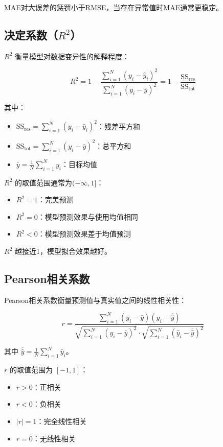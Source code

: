 \documentclass[UTF8, a4paper, 12pt]{article}
\begin{document}
MAE对大误差的惩罚小于RMSE，当存在异常值时MAE通常更稳定。

\subsection{决定系数（$R^2$）}

$R^2$ 衡量模型对数据变异性的解释程度：

\begin{equation}
R^2 = 1 - \frac{\sum_{i=1}^{N} (y_i - \hat{y}_i)^2}{\sum_{i=1}^{N} (y_i - \bar{y})^2} = 1 - \frac{\text{SS}_{\text{res}}}{\text{SS}_{\text{tot}}}
\end{equation}

其中：
\begin{itemize}
    \item $\text{SS}_{\text{res}} = \sum_{i=1}^{N} (y_i - \hat{y}_i)^2$：残差平方和
    \item $\text{SS}_{\text{tot}} = \sum_{i=1}^{N} (y_i - \bar{y})^2$：总平方和
    \item $\bar{y} = \frac{1}{N} \sum_{i=1}^{N} y_i$：目标均值
\end{itemize}

$R^2$ 的取值范围通常为$(-\infty, 1]$：
\begin{itemize}
    \item $R^2 = 1$：完美预测
    \item $R^2 = 0$：模型预测效果与使用均值相同
    \item $R^2 < 0$：模型预测效果差于均值预测
\end{itemize}

$R^2$ 越接近1，模型拟合效果越好。

\subsection{Pearson相关系数}

Pearson相关系数衡量预测值与真实值之间的线性相关性：

\begin{equation}
r = \frac{\sum_{i=1}^{N} (y_i - \bar{y})(\hat{y}_i - \overline{\hat{y}})}{\sqrt{\sum_{i=1}^{N} (y_i - \bar{y})^2} \cdot \sqrt{\sum_{i=1}^{N} (\hat{y}_i - \overline{\hat{y}})^2}}
\end{equation}

其中 $\overline{\hat{y}} = \frac{1}{N} \sum_{i=1}^{N} \hat{y}_i$。

$r$ 的取值范围为 $[-1, 1]$：
\begin{itemize}
    \item $r > 0$：正相关
    \item $r < 0$：负相关
    \item $|r| = 1$：完全线性相关
    \item $r = 0$：无线性相关
\end{itemize}
\end{document}
